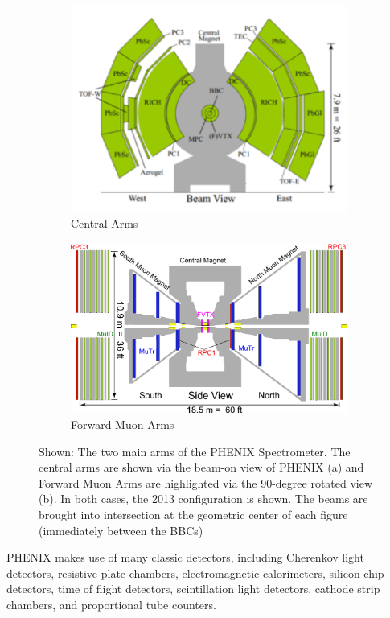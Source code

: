 \begin{figure}
  \centering
  \begin{subfigure}[t]{\textwidth}
    \centering
    \includegraphics[width=0.8\linewidth]{./figures/phenix_2013_config_central_arms}
    \caption{Central Arms}
    \label{fig:phenix_central} 
  \end{subfigure} 
  \begin{subfigure}[t]{\textwidth}
    \centering
    \includegraphics[width=0.8\linewidth]{./figures/phenix_2013_config_muon_arms}
    \caption{Forward Muon Arms}
    \label{fig:phenix_forward}
  \end{subfigure}
  \caption{
    Shown: The two main arms of the PHENIX Spectrometer. The central arms are
    shown via the beam-on view of PHENIX (a) and Forward Muon Arms are
    highlighted via the 90-degree rotated view (b). In both cases, the 2013
    configuration is shown. The beams are brought into intersection at the
    geometric center of each figure (immediately between the BBCs)
  }
  \label{fig:phenix_2013_config}
\end{figure}

PHENIX makes use of many classic detectors, including  Cherenkov light
detectors, resistive plate chambers, electromagnetic calorimeters, silicon chip
detectors, time of flight detectors, scintillation light detectors, cathode
strip chambers, and proportional tube counters.

